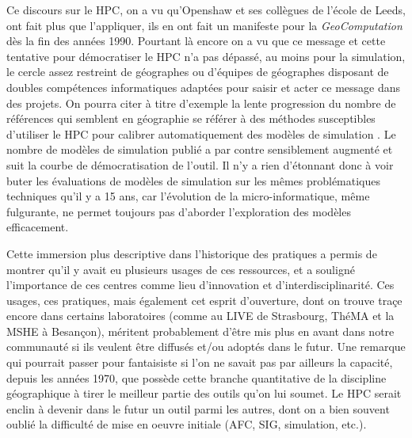 Ce discours sur le HPC, on a vu qu'Openshaw et ses collègues de l'école de Leeds, ont fait plus que l'appliquer, ils en ont fait un manifeste pour la \textit{GeoComputation} \autocite{Openshaw2000b} dès la fin des années 1990. Pourtant là encore on a vu que ce message et cette tentative pour démocratiser le HPC n'a pas dépassé, au moins pour la simulation, le cercle assez restreint de géographes ou d'équipes de géographes disposant de doubles compétences informatiques adaptées pour saisir et acter ce message dans des projets. On pourra citer à titre d'exemple la lente progression du nombre de références  qui semblent en géographie se référer à des méthodes susceptibles d'utiliser le HPC pour calibrer automatiquement des modèles de simulation \autocites{Diplock1996, Ngo2012, Straatman2004, Heppenstall2007, Schmitt2015, Wu1998, Wu2002, Li2001, Ahmadi2009}. Le nombre de modèles de simulation publié a par contre sensiblement augmenté et suit la courbe de démocratisation de l'outil. Il n'y a rien d'étonnant donc à voir buter les évaluations de modèles de simulation sur les mêmes problématiques techniques qu'il y a 15 ans, car l'évolution de la micro-informatique, même fulgurante, ne permet toujours pas d'aborder l'exploration des modèles efficacement.


Cette immersion plus descriptive dans l'historique des pratiques a permis de montrer qu'il y avait eu plusieurs usages de ces ressources, et a souligné l'importance de ces centres comme lieu d'innovation et d'interdisciplinarité. Ces usages, ces pratiques, mais également cet esprit d'ouverture, dont on trouve traçe encore dans certains laboratoires (comme au LIVE de Strasbourg, ThéMA et la MSHE à Besançon), méritent probablement d'être mis plus en avant dans notre communauté si ils veulent être diffusés et/ou adoptés dans le futur. Une remarque qui pourrait passer pour fantaisiste si l'on ne savait pas par ailleurs la capacité, depuis les années 1970, que possède cette branche quantitative de la discipline géographique à tirer le meilleur partie des outils qu'on lui soumet. Le HPC serait enclin à devenir dans le futur un outil parmi les autres, dont on a bien souvent oublié la difficulté de mise en oeuvre initiale (AFC, SIG, simulation, etc.).

